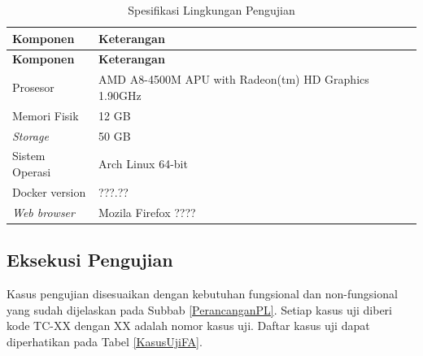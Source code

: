 	\begin{small}
	\begin{longtable}{ | p{3cm} | p{9cm} | }
	    \caption{Spesifikasi Lingkungan Pengujian}
	    \label{LingPengujian}\\ \hline
	    \centering\bfseries{Komponen} & \centering\bfseries{Keterangan} \tabularnewline \hline
	    \endfirsthead
	    \hline
	    \centering\bfseries{Komponen} & \centering\bfseries{Keterangan} \tabularnewline \hline
	    \endhead
		Prosesor & AMD A8-4500M APU with Radeon(tm) HD Graphics 1.90GHz\\ \hline
		Memori Fisik & 12 GB\\ \hline
		\textit{Storage} & 50 GB\\ \hline
		Sistem Operasi & Arch Linux 64-bit\\ \hline
		Docker version & ???.??\\ \hline
		\textit{Web browser} & Mozila Firefox ????\\ \hline
	\end{longtable}
	\end{small}

	\subsection{Eksekusi Pengujian}
	Kasus pengujian disesuaikan dengan kebutuhan fungsional dan non-fungsional yang sudah dijelaskan pada Subbab \ref{PerancanganPL}. Setiap kasus uji diberi kode TC-XX dengan XX adalah nomor kasus uji. Daftar kasus uji dapat diperhatikan pada Tabel \ref{KasusUjiFA}.

